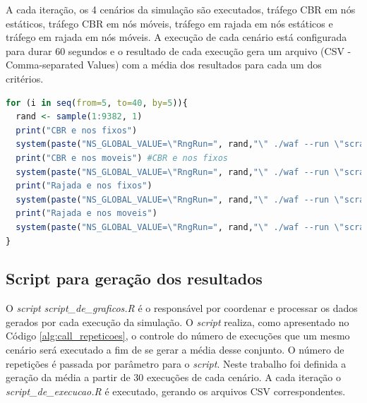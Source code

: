 \documentclass[12pt]{article}
\begin{document}
A cada iteração, os 4 cenários da simulação são executados, tráfego CBR em nós estáticos, tráfego CBR em nós móveis, tráfego em rajada em nós estáticos e tráfego em rajada em nós móveis. A execução de cada cenário está configurada para durar 60 segundos e o resultado de cada execução gera um arquivo (CSV - Comma-separated Values) com a média dos resultados para cada um dos critérios.

\begin{lstlisting}[language=R, caption=Laço de repetição aplicado na execução da simulação, label=alg:script_de_execucao]
for (i in seq(from=5, to=40, by=5)){
  rand <- sample(1:9382, 1)
  print("CBR e nos fixos")
  system(paste("NS_GLOBAL_VALUE=\"RngRun=", rand,"\" ./waf --run \"scratch/wifiinfra --nodes=",i," --runningTime=60 --traffic=true --mobility=false --printLog=false --prefix=\\\"",args[1],"\\\"   \"", collapse=", ", sep=""))
  print("CBR e nos moveis") #CBR e nos fixos
  system(paste("NS_GLOBAL_VALUE=\"RngRun=", rand,"\" ./waf --run \"scratch/wifiinfra --nodes=",i," --runningTime=60 --traffic=true --mobility=true --printLog=false --prefix=\\\"",args[1],"\\\"    \"", collapse=", ", sep=""))
  print("Rajada e nos fixos")
  system(paste("NS_GLOBAL_VALUE=\"RngRun=", rand,"\" ./waf --run \"scratch/wifiinfra --nodes=",i," --runningTime=60 --traffic=false --mobility=false --printLog=false --prefix=\\\"",args[1],"\\\"   \"", collapse=", ", sep=""))
  print("Rajada e nos moveis")
  system(paste("NS_GLOBAL_VALUE=\"RngRun=", rand,"\" ./waf --run \"scratch/wifiinfra --nodes=",i," --runningTime=60 --traffic=false --mobility=true --printLog=false --prefix=\\\"",args[1],"\\\"   \"", collapse=", ", sep=""))
}
\end{lstlisting}

\subsection{Script para geração dos resultados}

O \textit{script} \textit{script\_de\_graficos.R} é o responsável por coordenar e processar os dados gerados por cada execução da simulação. O \textit{script} realiza, como apresentado no Código \ref{alg:call_repeticoes}, o controle do número de execuções que um mesmo cenário será executado a fim de se gerar a média desse conjunto. O número de repetições é passada por parâmetro para o \textit{script}. Neste trabalho foi definida a geração da média a partir de 30 execuções de cada cenário. A cada iteração o \textit{script\_de\_execucao.R} é executado, gerando os arquivos CSV correspondentes.
\end{document}
